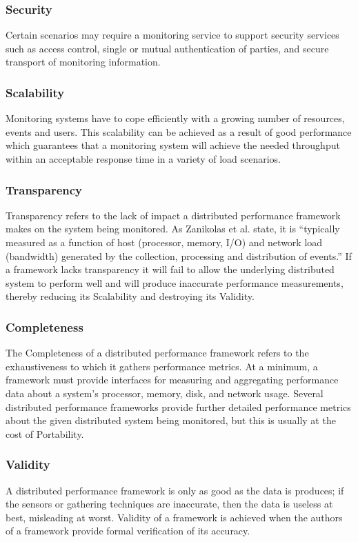 \documentclass{beamer}
\begin{document}
\begin{frame}
\frametitle{Security}
Certain scenarios may require a monitoring service to support security services such as access control, single or mutual
authentication of parties, and secure transport of monitoring information.
\end{frame}

\begin{frame}
\frametitle{Scalability}
Monitoring systems have to cope efficiently with a growing number of resources, events and users. This scalability can
be achieved as a result of good performance which guarantees that a monitoring system will achieve the needed throughput
within an acceptable response time in a variety of load scenarios.
\end{frame}

\begin{frame}
\frametitle{Transparency}
Transparency refers to the lack of impact a distributed performance framework makes on the system being monitored. As
Zanikolas et al. state, it is ``typically measured as a function of host (processor, memory, I/O) and network load
(bandwidth) generated by the collection, processing and distribution of events.'' If a framework lacks transparency it
will fail to allow the underlying distributed system to perform well and will produce inaccurate performance
measurements, thereby reducing its Scalability and destroying its Validity.
\end{frame}

\begin{frame}
\frametitle{Completeness}
The Completeness of a distributed performance framework refers to the exhaustiveness to which it gathers performance
metrics. At a minimum, a framework must provide interfaces for measuring and aggregating performance data about a
system's processor, memory, disk, and network usage. Several distributed performance frameworks provide further detailed
performance metrics about the given distributed system being monitored, but this is usually at the cost of Portability.
\end{frame}

\begin{frame}
\frametitle{Validity}
A distributed performance framework is only as good as the data is produces; if the sensors or gathering techniques are
inaccurate, then the data is useless at best, misleading at worst. Validity of a framework is achieved when the authors
of a framework provide formal verification of its accuracy.
\end{frame}
\end{document}

